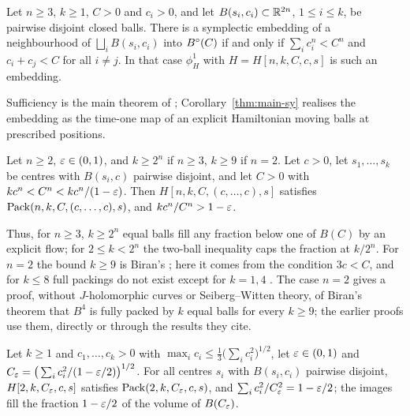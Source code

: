 \begin{maincorollary}\label{thm:main-sy}
Let $n\ge3$, $k\ge1$, $C>0$ and $c_i>0$, and let $B(s_i,c_i)\subset\mathbb{R}^{2n}$, $1\le i\le k$, be pairwise disjoint closed balls.
There is a symplectic embedding of a neighbourhood of $\bigsqcup_iB(s_i,c_i)$ into $B^{\circ}(C)$ if and only if
$\sum_ic_i^n<C^n$ and $c_i+c_j<C$ for all $i\ne j$. In that case $\phi^1_H$ with $H=H[n,k,C,c,s]$ is such
an embedding.
\end{maincorollary}

Sufficiency is the main theorem of \cite{OpenAI2026}; Corollary~\ref{thm:main-sy} realises the embedding as the
time-one map of an explicit Hamiltonian moving balls at prescribed positions.

\begin{maincorollary}\label{thm:main-equal}
Let $n\ge2$, $\varepsilon\in(0,1)$, and $k\ge2^n$ if $n\ge3$, $k\ge9$ if $n=2$. Let $c>0$, let $s_1,\dots,s_k$ be
centres with $B(s_i,c)$ pairwise disjoint, and let $C>0$ with $kc^n<C^n<kc^n/(1-\varepsilon)$. Then
$H[n,k,C,(c,\dots,c),s]$ satisfies $\mathrm{Pack}(n,k,C,(c,\dots,c),s)$, and $kc^n/C^n>1-\varepsilon$.
\end{maincorollary}

Thus, for $n\ge3$, $k\ge2^n$ equal balls fill any fraction below one of $B(C)$ by an explicit flow; for $2\le k<2^n$
the two-ball inequality caps the fraction at $k/2^n$. For $n=2$ the bound $k\ge9$ is Biran's \cite{Biran1997}; here it
comes from the condition $3c<C$, and for $k\le8$ full packings do not exist except for $k=1,4$
\cite{McDuffPolterovich1994}. The case $n=2$ gives a proof, without $J$-holomorphic curves or Seiberg--Witten theory, of Biran's
theorem that $B^4$ is fully packed by $k$ equal balls for every $k\ge9$; the earlier proofs \cite{Biran1997,Biran1999,BuseHind2013,BuseHindOpshtein2016}
use them, directly or through the results they cite.

\begin{maincorollary}\label{thm:main-cone4}
Let $k\ge1$ and $c_1,\dots,c_k>0$ with $\max_ic_i\le\frac13\big(\sum_ic_i^2\big)^{1/2}$, let $\varepsilon\in(0,1)$ and
$C_\varepsilon=\big(\sum_ic_i^2/(1-\varepsilon/2)\big)^{1/2}$. For all centres $s_i$ with $B(s_i,c_i)$ pairwise disjoint,
$H[2,k,C_\varepsilon,c,s]$ satisfies $\mathrm{Pack}(2,k,C_\varepsilon,c,s)$, and $\sum_ic_i^2/C_\varepsilon^2=1-\varepsilon/2$; the images fill the fraction
$1-\varepsilon/2$ of the volume of $B(C_\varepsilon)$.
\end{maincorollary}

